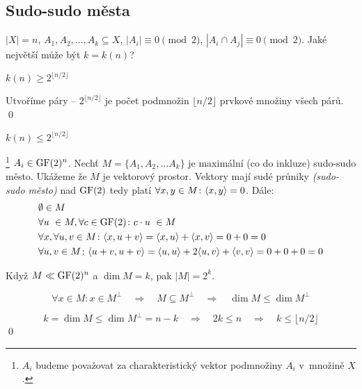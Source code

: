 \subsection{Sudo-sudo města}

\df $|X| = n$, $A_1, A_2, \dots, A_k \subseteq X$, $|A_i| \equiv 0 \pmod 2$, $|A_i\cap
A_j| \equiv 0 \pmod 2$. Jaké největší může být $k = k(n)$?

\vt $k(n) \ge 2^{\lfloor n / 2 \rfloor}$

\dk Utvoříme páry -- $2^{\lfloor n / 2 \rfloor}$ je počet podmnožin $\lfloor n / 2
\rfloor$ prvkové množiny všech párů. \qed

\vt $k(n) \le 2^{\lfloor n / 2 \rfloor}$

\dk\footnote{$A_i$ budeme považovat za charakteristický vektor podmnožiny $A_i$
v~množině $X$.} $A_i \in \mathrm{GF}(2)^n$. Nechť $M=\{A_1, A_2, \dots A_k\}$ je maximální (co do inkluze)
sudo-sudo město. Ukážeme že $M$ je vektorový prostor.
Vektory mají sudé průniky {\it (sudo-sudo město)} nad $\mathrm{GF}(2)$ tedy platí $\forall x,y\in M\colon {\langle x,y\rangle} = 0$.
Dále:
\begin{align*}
	&\emptyset \in M \\
	&\forall u~\in M, \forall c\in \mathrm{GF}(2)\colon c\cdot u~\in M \\
	&\forall x, \forall u,v\in M\colon {\langle x, u+v\rangle} = {\langle x,u\rangle} + {\langle x,v\rangle} = 0 + 0 = 0 \\
	&\forall u,v \in M\colon {\langle u+v,u+v\rangle} = {\langle u,u\rangle} + 2{\langle u,v\rangle} + {\langle v,v\rangle} = 0 + 0 + 0 = 0
\end{align*}

Když $M \ll \mathrm{GF}(2)^n$ a $\dim M = k$, pak $|M| = 2^k$. 

$$\forall x\in M\colon x\in M^\bot \quad\Rightarrow\quad M\subseteq M^\bot \quad\Rightarrow\quad \dim M \le \dim M^\bot$$

$$k = \dim M \le \dim M^\bot = n-k \quad\Rightarrow\quad 2k \le n
\quad\Rightarrow\quad k \le \lfloor {n / 2} \rfloor$$
\qed


